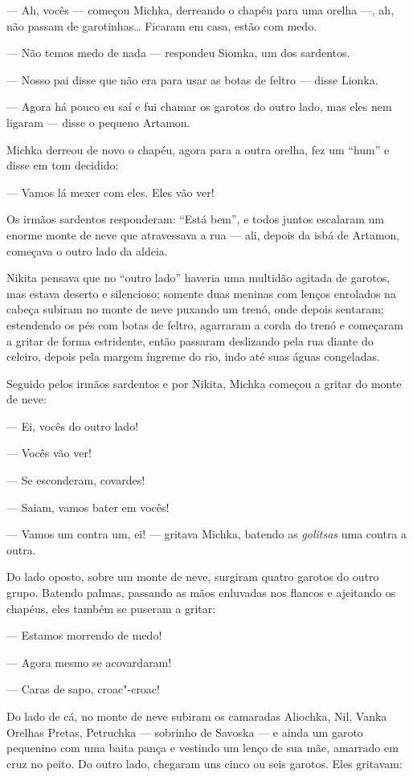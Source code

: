 --- Ah, vocês --- começou Michka, derreando o chapéu para uma
orelha ---, ah, não passam de garotinhas\ldots{} Ficaram em casa, estão com
medo.

--- Não temos medo de nada --- respondeu Siomka, um dos sardentos.

--- Nosso pai disse que não era para usar as botas de feltro --- disse
Lionka.

--- Agora há pouco eu saí e fui chamar os garotos do outro lado, mas
eles nem ligaram --- disse o pequeno Artamon.

Michka derreou de novo o chapéu, agora para a outra orelha, fez um
``hum'' e disse em tom decidido:

--- Vamos lá mexer com eles. Eles vão ver!

Os irmãos sardentos responderam: ``Está bem'', e todos juntos escalaram
um enorme monte de neve que atravessava a rua --- ali, depois da isbá de
Artamon, começava o outro lado da aldeia.

Nikita pensava que no ``outro lado'' haveria uma multidão
agitada de garotos, mas estava deserto e silencioso; somente duas
meninas com lenços enrolados na cabeça subiram no monte de neve puxando um trenó,
onde depois sentaram; estendendo os pés com botas de feltro, agarraram a
corda do trenó e começaram a gritar de forma estridente, então passaram
deslizando pela rua diante do celeiro, depois pela margem
íngreme do rio, indo até suas águas congeladas.

Seguido pelos irmãos sardentos e por Nikita, Michka começou a gritar do
monte de neve:

--- Ei, vocês do outro lado!

--- Vocês vão ver!

--- Se esconderam, covardes!

--- Saiam, vamos bater em vocês!

--- Vamos um contra um, ei! --- gritava Michka, batendo as
\emph{golitsas} uma contra a outra.

Do lado oposto, sobre um monte de neve, surgiram quatro garotos do outro
grupo. Batendo palmas, passando as mãos enluvadas nos flancos e
ajeitando os chapéus, eles também se puseram a gritar:

--- Estamos morrendo de medo!

--- Agora mesmo se acovardaram!

--- Caras de sapo, croac"-croac!

Do lado de cá, no monte de neve subiram os camaradas Aliochka, Nil,
Vanka Orelhas Pretas, Petruchka --- sobrinho de Savoska --- e ainda um
garoto pequenino com uma baita pança e vestindo um lenço de sua mãe,
amarrado em cruz no peito. Do outro lado, chegaram uns cinco ou seis
garotos. Eles gritavam:

